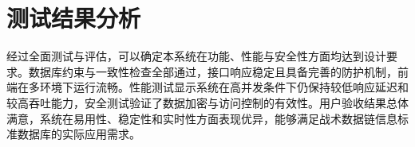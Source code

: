 \begin{table}[H]
\centering
\caption{可视化界面认知负荷测试结果}
\label{tab:visualization-test}
\end{table}


\section{测试结果分析}

经过全面测试与评估，可以确定本系统在功能、性能与安全性方面均达到设计要求。数据库约束与一致性检查全部通过，接口响应稳定且具备完善的防护机制，前端在多环境下运行流畅。性能测试显示系统在高并发条件下仍保持较低响应延迟和较高吞吐能力，安全测试验证了数据加密与访问控制的有效性。用户验收结果总体满意，系统在易用性、稳定性和实时性方面表现优异，能够满足战术数据链信息标准数据库的实际应用需求。
